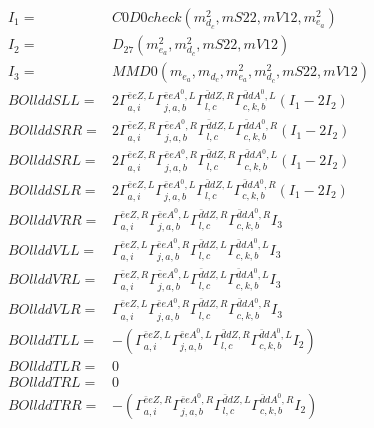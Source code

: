 \documentclass[A4,landscape]{article}
\begin{document}
\begin{align} 
I_1 = & C0D0check(m^2_{d_{{c}}}, mS22, mV12, m^2_{e_{{a}}}) \\ 
I_2 = & D_{27}(m^2_{e_{{a}}}, m^2_{d_{{c}}}, mS22, mV12) \\ 
I_3 = & MMD0(m_{e_{{a}}}, m_{d_{{c}}}, m^2_{e_{{a}}}, m^2_{d_{{c}}}, mS22, mV12) \\ 
  BOllddSLL= & 2  \Gamma^{\bar{e}e Z ,L}_{a, i} \Gamma^{\bar{e}e A^0 ,L}_{j, a, b} \Gamma^{\bar{d}d Z ,R}_{l, c} \Gamma^{\bar{d}d A^0 ,L}_{c, k, b} (I_1 - 2 I_2) \\ 
  BOllddSRR= & 2  \Gamma^{\bar{e}e Z ,R}_{a, i} \Gamma^{\bar{e}e A^0 ,R}_{j, a, b} \Gamma^{\bar{d}d Z ,L}_{l, c} \Gamma^{\bar{d}d A^0 ,R}_{c, k, b} (I_1 - 2 I_2) \\ 
  BOllddSRL= & 2  \Gamma^{\bar{e}e Z ,R}_{a, i} \Gamma^{\bar{e}e A^0 ,R}_{j, a, b} \Gamma^{\bar{d}d Z ,R}_{l, c} \Gamma^{\bar{d}d A^0 ,L}_{c, k, b} (I_1 - 2 I_2) \\ 
  BOllddSLR= & 2  \Gamma^{\bar{e}e Z ,L}_{a, i} \Gamma^{\bar{e}e A^0 ,L}_{j, a, b} \Gamma^{\bar{d}d Z ,L}_{l, c} \Gamma^{\bar{d}d A^0 ,R}_{c, k, b} (I_1 - 2 I_2) \\ 
  BOllddVRR= &  \Gamma^{\bar{e}e Z ,R}_{a, i} \Gamma^{\bar{e}e A^0 ,L}_{j, a, b} \Gamma^{\bar{d}d Z ,R}_{l, c} \Gamma^{\bar{d}d A^0 ,R}_{c, k, b} I_3 \\ 
  BOllddVLL= &  \Gamma^{\bar{e}e Z ,L}_{a, i} \Gamma^{\bar{e}e A^0 ,R}_{j, a, b} \Gamma^{\bar{d}d Z ,L}_{l, c} \Gamma^{\bar{d}d A^0 ,L}_{c, k, b} I_3 \\ 
  BOllddVRL= &  \Gamma^{\bar{e}e Z ,R}_{a, i} \Gamma^{\bar{e}e A^0 ,L}_{j, a, b} \Gamma^{\bar{d}d Z ,L}_{l, c} \Gamma^{\bar{d}d A^0 ,L}_{c, k, b} I_3 \\ 
  BOllddVLR= &  \Gamma^{\bar{e}e Z ,L}_{a, i} \Gamma^{\bar{e}e A^0 ,R}_{j, a, b} \Gamma^{\bar{d}d Z ,R}_{l, c} \Gamma^{\bar{d}d A^0 ,R}_{c, k, b} I_3 \\ 
  BOllddTLL= & -( \Gamma^{\bar{e}e Z ,L}_{a, i} \Gamma^{\bar{e}e A^0 ,L}_{j, a, b} \Gamma^{\bar{d}d Z ,R}_{l, c} \Gamma^{\bar{d}d A^0 ,L}_{c, k, b} I_2) \\ 
  BOllddTLR= & 0 \\ 
  BOllddTRL= & 0 \\ 
  BOllddTRR= & -( \Gamma^{\bar{e}e Z ,R}_{a, i} \Gamma^{\bar{e}e A^0 ,R}_{j, a, b} \Gamma^{\bar{d}d Z ,L}_{l, c} \Gamma^{\bar{d}d A^0 ,R}_{c, k, b} I_2) \\ 
\end{align} 
\end{document}
